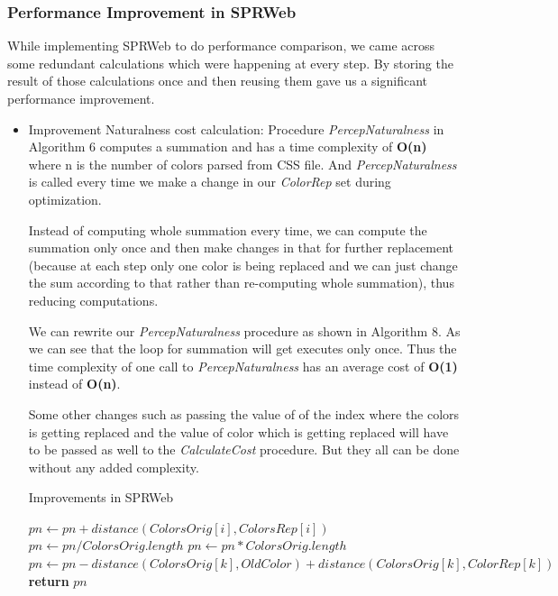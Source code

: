 \subsubsection{Performance Improvement in SPRWeb} 
\label{Improvement in SPRWeb}



While implementing SPRWeb to do performance comparison, we came across some redundant calculations which were happening at every step. By storing the result of those calculations once and then reusing them gave us a significant performance improvement.

\begin{itemize}
\item {Improvement Naturalness cost calculation:} Procedure \textit{PercepNaturalness} in Algorithm 6 computes a summation and has a time complexity of \textbf{O(n)} where n is the number of colors parsed from CSS file. And \textit{PercepNaturalness} is called every time we make a change in our \textit{ColorRep} set during optimization.

Instead of computing whole summation every time, we can compute the summation only once and then make changes in that for further replacement (because at each step only one color is being replaced and we can just change the sum according to that rather than re-computing whole summation), thus reducing computations.

We can rewrite our \textit{PercepNaturalness} procedure as shown in Algorithm 8. As we can see that the  loop for summation will get executes only once. Thus the time complexity of one call to \textit{PercepNaturalness} has an average cost of \textbf{O(1)} instead of \textbf{O(n)}.

Some other changes such as passing the value of of the index where the colors is getting replaced and the value of color which is getting replaced will have to be passed as well to the \textit{CalculateCost} procedure. But they all can be done without any added complexity. 

\begin{algorithm}[!htb]
\caption{Improvements in SPRWeb}\label{Improvements Naturalness}
\begin{algorithmic}[1]
 
  
			\State $pn \gets pn + distance(ColorsOrig[i],ColorsRep[i])$
		\EndFor
	\State $pn \gets pn/ColorsOrig.length$
\Else
\State $pn \gets pn*ColorsOrig.length$
\State $pn  \gets pn - distance(ColorsOrig[k],OldColor) + distance(ColorsOrig[k],ColorRep[k])$ 
\EndIf
\State \textbf{return} $pn$
\EndProcedure
\end{algorithmic}
\end{algorithm}


\end{itemize}
